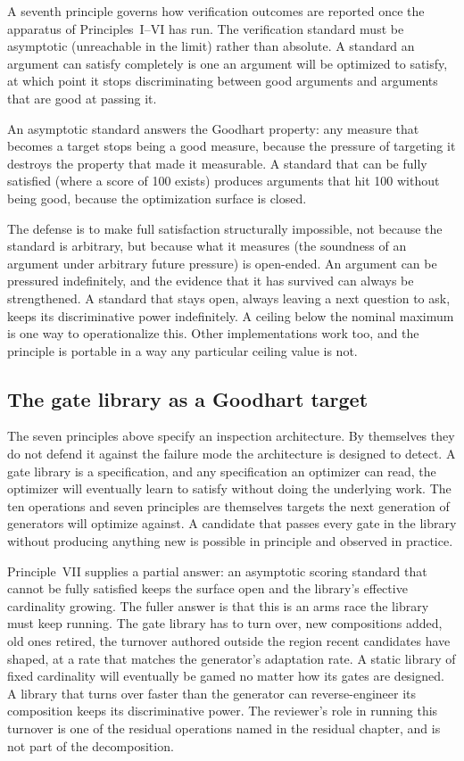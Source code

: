 \documentclass[
  11pt,
]{article}
\begin{document}
A seventh principle governs how verification outcomes are reported once
the apparatus of Principles~I--VI has run. The verification standard must
be asymptotic (unreachable in the limit) rather than absolute. A standard
an argument can satisfy completely is one an argument will be optimized to
satisfy, at which point it stops discriminating between good arguments and
arguments that are good at passing it.

An asymptotic standard answers the Goodhart property: any measure that
becomes a target stops being a good measure, because the pressure of
targeting it destroys the property that made it measurable. A standard
that can be fully satisfied (where a score of 100 exists) produces
arguments that hit 100 without being good, because the optimization
surface is closed.

The defense is to make full satisfaction structurally impossible, not
because the standard is arbitrary, but because what it measures (the
soundness of an argument under arbitrary future pressure) is open-ended. An argument can be pressured indefinitely, and the evidence
that it has survived can always be strengthened. A standard that stays
open, always leaving a next question to ask, keeps its discriminative
power indefinitely. A ceiling below the nominal maximum is one way to
operationalize this. Other implementations work too, and the principle is
portable in a way any particular ceiling value is not.

\subsection{The gate library as a Goodhart target}\label{the-gate-library-is-itself-a-goodhart-target}

The seven principles above specify an inspection architecture. By
themselves they do not defend it against the failure mode the
architecture is designed to detect. A gate library is a specification,
and any specification an optimizer can read, the
optimizer will eventually learn to satisfy without doing the underlying
work. The ten operations and seven principles are themselves targets the next generation of
generators will optimize against. A candidate that passes every gate in
the library without producing anything new is possible in
principle and observed in practice.

Principle~VII supplies a partial answer: an asymptotic scoring standard
that cannot be fully satisfied keeps the surface open and the library's
effective cardinality growing. The fuller answer is that this is an
arms race the library must keep running. The gate library has to
turn over, new compositions added, old ones retired, the turnover
authored outside the region recent candidates have shaped, at a rate
that matches the generator's adaptation rate. A static library of fixed
cardinality will eventually be gamed no matter how its gates
are designed. A library that turns over faster than the generator can
reverse-engineer its composition keeps its discriminative power. The
reviewer's role in running this turnover is one of the residual
operations named in the residual chapter, and is not part of the decomposition.
\end{document}

